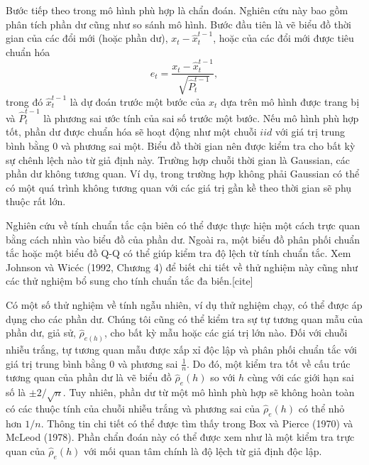 \documentclass[12pt, a4paper,oneside]{book}
\theoremstyle{definition}
\begin{document}
Bước tiếp theo trong mô hình phù hợp là chẩn đoán. Nghiên cứu này bao gồm phân tích phần dư cũng như so sánh mô hình. Bước đầu tiên là vẽ biểu đồ thời gian của các đổi mới (hoặc phần dư), $x_{t}-\hat{x}_{t}^{t-1}$, hoặc của các đổi mới được tiêu chuẩn hóa
\begin{equation}
e_{t}=  \frac{x_{t}-\hat{x}_{t}^{t-1}}{\sqrt[]{\hat{P}_t^{t-1}}} , \label{ct1.191}
\end{equation}
trong đó $\hat{x}_{t}^{t-1}$ là dự đoán trước một bước của $x_{t}$ dựa trên mô hình được trang bị và $\hat{P}_t^{t-1}$ là phương sai ước tính của sai số trước một bước. Nếu mô hình phù hợp tốt, phần dư được chuẩn hóa sẽ hoạt động như một chuỗi $iid$ với giá trị trung bình bằng 0 và phương sai một. Biểu đồ thời gian nên được kiểm tra cho bất kỳ sự chênh lệch nào từ giả định này. Trường hợp chuỗi thời gian là Gaussian, các phần dư không tương quan. Ví dụ, trong trường hợp không phải Gaussian có thể có một quá trình không tương quan với các giá trị gần kề theo thời gian sẽ phụ thuộc rất lớn.

Nghiên cứu về tính chuẩn tắc cận biên có thể được thực hiện một cách trực quan bằng cách nhìn vào biểu đồ của phần dư. Ngoài ra, một biểu đồ phân phối chuẩn tắc hoặc một biểu đồ Q-Q có thể giúp kiểm tra độ lệch từ tính chuẩn tắc. Xem Johnson và Wicéc (1992, Chương 4) để biết chi tiết về thử nghiệm này cũng như các thử nghiệm bổ sung cho tính chuẩn tắc đa biến.[cite]

Có một số thử nghiệm về tính ngẫu nhiên, ví dụ thử nghiệm chạy, có thể được áp dụng cho các phần dư. Chúng tôi cũng có thể kiểm tra sự tự tương quan mẫu của phần dư, giả sử, $\hat{\rho}_{e(h)}$, cho bất kỳ mẫu hoặc các giá trị lớn nào. Đối với chuỗi nhiễu trắng, tự tương quan mẫu được xấp xỉ độc lập và phân phối chuẩn tắc với giá trị trung bình bằng $0$ và phương sai $\frac{1}{n}$. Do đó, một kiểm tra tốt về cấu trúc tương quan của phần dư là vẽ biểu đồ $\hat{\rho}_{e}(h)$ so với $h$ cùng với các giới hạn sai số là $\pm2/\sqrt{n}$. Tuy nhiên, phần dư từ một mô hình phù hợp sẽ không hoàn toàn có các thuộc tính của chuỗi nhiễu trắng và phương sai của $\hat{\rho}_{e}(h)$ có thể nhỏ hơn $1/n$. Thông tin chi tiết có thể được tìm thấy trong Box và Pierce (1970) và McLeod (1978). Phần chẩn đoán này có thể được xem như là một kiểm tra trực quan của $\hat{\rho}_{e}(h)$ với mối quan tâm chính là độ lệch từ giả định độc lập. 
\end{document}
